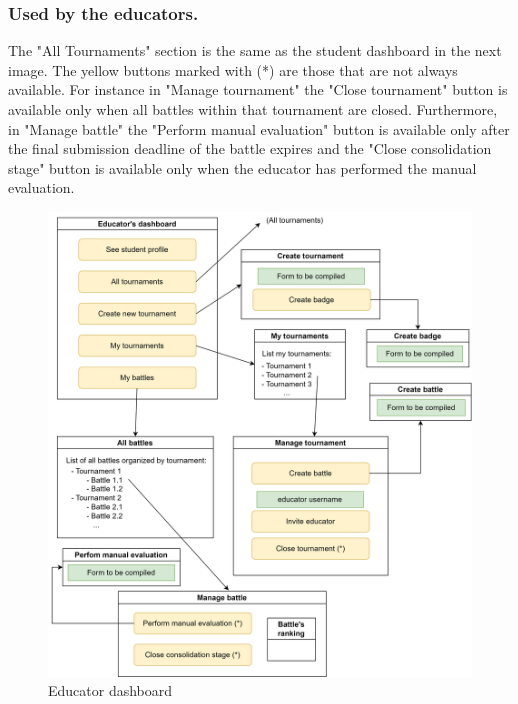 \subsubsection*{Used by the educators.}
The "All Tournaments" section is the same as the student dashboard in the next image. \newline
The yellow buttons marked with (*) are those that are not always available. For instance in "Manage tournament" the "Close tournament" button is available only when all battles within that tournament are closed. Furthermore, in "Manage battle" the "Perform manual evaluation" button is available only after the final submission deadline of the battle expires and the "Close consolidation stage" button is available only when the educator has performed the manual evaluation.
\begin{figure}[h]
    \centering
    \includegraphics[scale=0.7]{images/educator_dashboard.png}
    \caption{Educator dashboard}
    \label{fig:edDash}
\end{figure}


